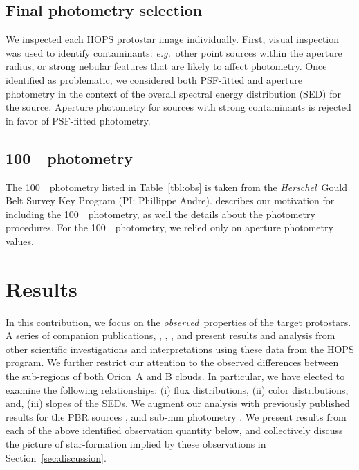 \documentclass[manuscript]{aastex}
\newcommand{\herschel}{{\em Herschel}}
\begin{document}
\subsection{Final photometry selection}
\label{sec-eyeballs}
We inspected each HOPS protostar image individually.  First, visual inspection was used to identify contaminants: {\it e.g.}\ other point sources within the aperture radius, or strong nebular features that are likely to affect photometry.  Once identified as problematic, we considered both PSF-fitted and aperture photometry in the context of the overall spectral energy distribution (SED) for the source.  Aperture photometry for sources with strong contaminants is rejected in favor of PSF-fitted photometry.

\subsection{100~\micron\ photometry}
\label{sec:gb100um}
The 100~\micron\ photometry listed in Table~\ref{tbl:obs} is taken from the \herschel\ Gould Belt Survey Key Program (PI: Phillippe Andre).  \cite{pbrpaper} describes our motivation for including the 100~\micron\ photometry, as well the details about the photometry procedures.  For the 100~\micron\ photometry, we relied only on aperture photometry values.

\section{Results}
\label{sec-results}
\par
In this contribution, we focus on the {\em observed}\ properties of the target protostars.  A series of companion publications, \cite{will}, \cite{furlan}, \cite{erin}, and \cite{pbrpaper} present results and analysis from other scientific investigations and interpretations using these data from the HOPS program.   We further restrict our attention to the observed differences between the sub-regions of both Orion~A and B clouds.  In particular, we have elected to examine the following relationships: (i) flux distributions, (ii) color distributions, and, (iii) slopes of the SEDs.  We augment our analysis with previously published results for the PBR sources \cite{pbrpaper}, and sub-mm photometry \citep{thomas}.  We present results from each of the above identified observation quantity below, and collectively discuss the picture of star-formation implied by these observations in Section~\ref{sec:discussion}.
\end{document}
